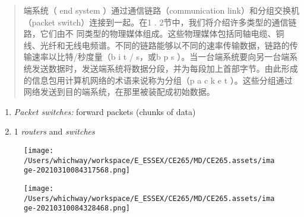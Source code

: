 \documentclass[
]{article}
\begin{document}
\begin{quote}
端系统（ end system ）通过通信链路（communication
link）和分组交换机（packet switch）连接到一起。在1 .
2节中，我们将介绍许多类型的通信链路，它们由不
同类型的物理媒体组成。这些物理媒体包括同轴电缆、铜线、光纤和无线电频谱。不同的链路能够以不同的速率传输数据，链路的传输速率以比特/秒度量（b
i t / s，或b p s
）。当一台端系统要向另一台端系统发送数据时，发送端系统将数据分段，并为每段加上首部字节。由此形成的信息包用计算机网络的术语来说称为分组（p
a c k e t ）。这些分组通过网络发送到目的端系统，在那里被装配成初始数据。
\end{quote}

\begin{enumerate}
\def\labelenumi{\arabic{enumi}.}
\item
  \emph{Packet switches:} forward packets (chunks of data)
\item
  1 \emph{routers} and \emph{switches}
\end{enumerate}

\begin{figure}
\centering
\texttt{[image: /Users/whichway/workspace/E\_ESSEX/CE265/MD/CE265.assets/image-20210310084317568.png]}
\caption{}
\end{figure}

\begin{figure}
\centering
\texttt{[image: /Users/whichway/workspace/E\_ESSEX/CE265/MD/CE265.assets/image-20210310084328468.png]}
\caption{}
\end{figure}
\end{document}
